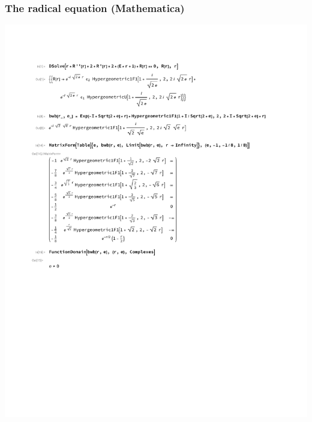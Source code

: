 \documentclass{beamer}
\begin{document}
\begin{frame}
\frametitle{The radical equation (Mathematica)}
\includegraphics[page=1, clip, trim=0in 0in 0in 1in, width=\textwidth]{classical hydrogen.pdf}
\end{frame}
\end{document}
